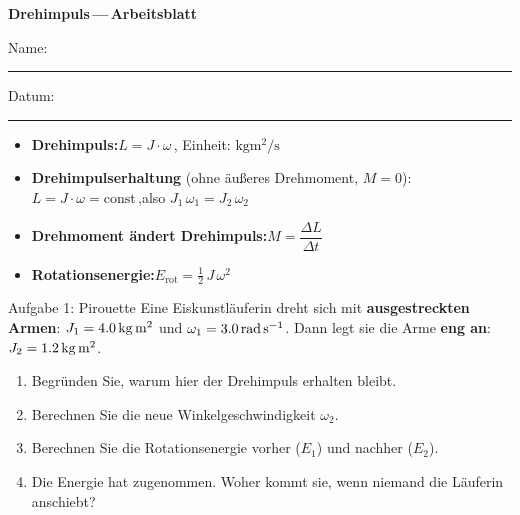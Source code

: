 \documentclass[11pt,a4paper,parskip=half]{scrartcl}
\begin{document}
\begin{center}
  {\LARGE\bfseries Drehimpuls\,---\,Arbeitsblatt}\\[2pt]
  {\small Name: \rule{5cm}{0.4pt} \hfill Datum: \rule{3cm}{0.4pt}}
\end{center}

\vspace{-2pt}

\begin{merkebox}
\begin{itemize}[leftmargin=1.2em, itemsep=2pt, topsep=0pt]
  \item \textbf{Drehimpuls:}\quad $L = J \cdot \omega$\,,\quad
        Einheit: $\si{\kilogram\metre\squared\per\second}$
  \item \textbf{Drehimpulserhaltung} (ohne \"au\ss{}eres Drehmoment, $M=0$):\quad
        $L = J \cdot \omega = \text{const}$\,,\quad also $J_1\,\omega_1 = J_2\,\omega_2$
  \item \textbf{Drehmoment \"andert Drehimpuls:}\quad $M = \dfrac{\Delta L}{\Delta t}$
  \item \textbf{Rotationsenergie:}\quad $E_{\text{rot}} = \tfrac{1}{2}\,J\,\omega^2$
\end{itemize}
\end{merkebox}

\vspace{4pt}

\begin{aufgabebox}{Aufgabe 1: Pirouette}
Eine Eiskunstl\"auferin dreht sich mit \textbf{ausgestreckten Armen}:
$J_1 = \SI{4{,}0}{\kilogram\metre\squared}$ und $\omega_1 = \SI{3{,}0}{\radian\per\second}$.
Dann legt sie die Arme \textbf{eng an}: $J_2 = \SI{1{,}2}{\kilogram\metre\squared}$.

\begin{enumerate}[label=\alph*), leftmargin=1.5em, itemsep=1pt]
  \item Begr\"unden Sie, warum hier der Drehimpuls erhalten bleibt.
  \item Berechnen Sie die neue Winkelgeschwindigkeit $\omega_2$.
  \item Berechnen Sie die Rotationsenergie vorher ($E_1$) und nachher ($E_2$).
  \item Die Energie hat zugenommen. Woher kommt sie, wenn niemand die L\"auferin anschiebt?
\end{enumerate}
\end{aufgabebox}
\end{document}
